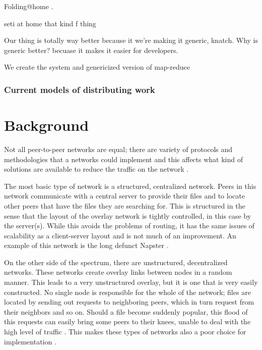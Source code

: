 \documentclass[conference, compsocconf, letterpaper]{IEEEtran}
\begin{document}
Folding@home \cite{folding}. 

seti at home that kind f thing



Our thing is totally way better because it we're making it generic, knatch.  Why is generic better?  becuase it makes it easier for developers. 

We create the system and genericized version of map-reduce 

\subsubsection{Current models of distributing work}




\section{Background}
Not all peer-to-peer networks are equal; there are variety of protocols and methodologies that a networks could implement and this affects what kind of solutions are available to reduce the traffic on the network    \cite{SurveyCompare} \cite{Overview}.

The most basic type of network is a structured, centralized  network.  Peers in this network communicate with a central server to provide their files and to locate other peers that have the files they are searching for.  This is structured in the sense that the layout of the overlay network is tightly controlled, in this case by the server(s). While this avoids the problems of routing, it has the same issues of scalability as a client-server layout and is not much of an improvement. An example of this network is the long defunct Napster  \cite{SurveyCompare} \cite{Overview}.

On the other side of the spectrum, there are unstructured, decentralized networks.  These networks create overlay links between nodes in a random manner. This leads to a very unstructured overlay, but it is one that is very easily constructed.  No single node is responsible for the whole of the network;  files are located by sending out requests to neighboring peers, which in turn request from their neighbors and so on. Should a file become suddenly popular, this flood of this requests can easily bring some peers to their knees, unable to deal with the high level of traffic \cite{Lv:2002:SRU:514191.514206}.  This makes these types of networks also a poor choice for implementation \cite{Overview}.
\end{document}
